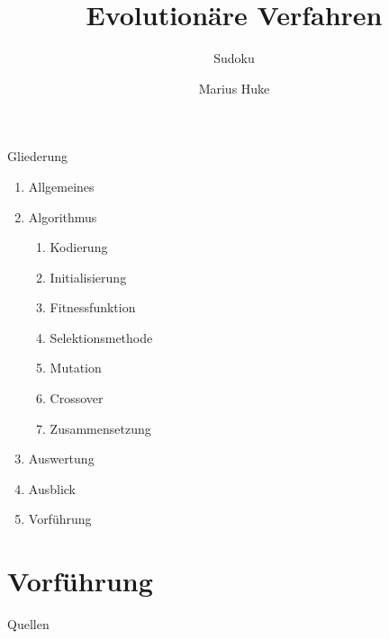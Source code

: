 \documentclass[10pt]{beamer}
\title{Evolutionäre Verfahren}
\subtitle{Sudoku}
\date{}
\author{Marius Huke}
\institute{TU Ilmenau}
\begin{document}
\maketitle


\begin{frame}{Gliederung}
  \begin{enumerate}
    \item Allgemeines
    \item Algorithmus
    \begin{enumerate}
      \item Kodierung
      \item Initialisierung
      \item Fitnessfunktion
      \item Selektionsmethode
      \item Mutation
      \item Crossover
      \item Zusammensetzung
    \end{enumerate}
    \item Auswertung
    \item Ausblick
    \item Vorführung
  \end{enumerate}
\end{frame}











\section{Vorführung}
\begin{frame}{Quellen}
  
  
\end{frame}
\end{document}
